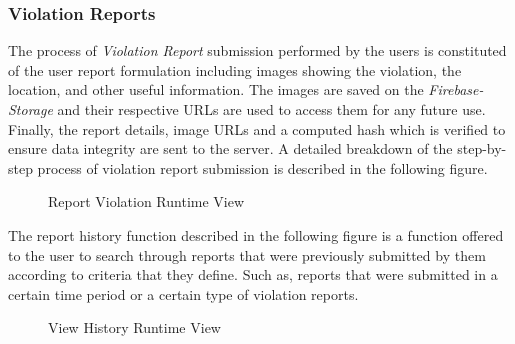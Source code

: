 \subsubsection{Violation Reports}
The process of \emph{Violation Report} submission performed by the users is constituted of the user report formulation including images showing the violation, the location, and other useful information. The images are saved on the \emph{Firebase-Storage} and their respective URLs are used to access them for any future use. Finally, the report details, image URLs and a computed hash which is verified to ensure data integrity are sent to the server. A detailed breakdown of the step-by-step process of violation report submission is described in the following figure.

\begin{figure}[H]
\caption{Report Violation Runtime View}
\label{fig:RuntimeRep}
\centering

\end{figure}

The report history function described in the following figure is a function offered to the user to search through reports that were previously submitted by them according to criteria that they define. Such as, reports that were submitted in a certain time period or a certain type of violation reports.
\begin{sidewaysfigure}
\begin{figure}[H]
\caption{View History Runtime View}
\label{fig:RuntimeHist}
\centering

\end{figure}
\end{sidewaysfigure}
